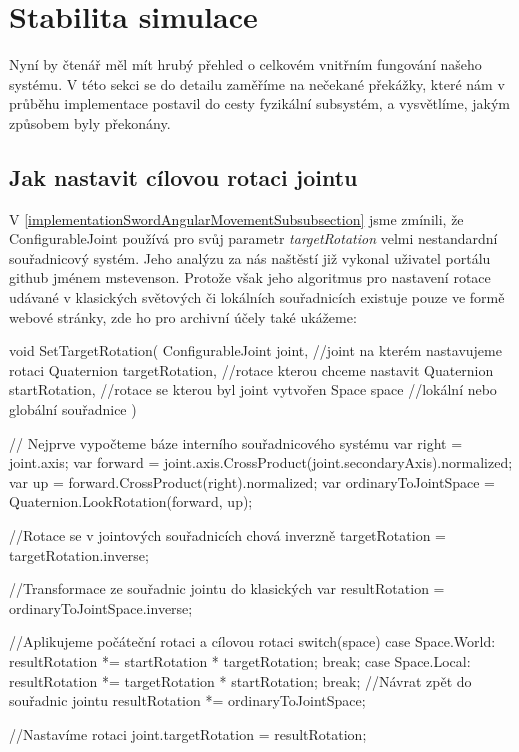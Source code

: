 \section{Stabilita simulace} \label{simulationStabilitySection}

Nyní by čtenář měl mít hrubý přehled o celkovém vnitřním fungování našeho systému. V této sekci se do detailu zaměříme na nečekané překážky, které nám v průběhu implementace postavil do cesty fyzikální subsystém, a vysvětlíme, jakým způsobem byly překonány.

\subsection{Jak nastavit cílovou rotaci jointu} \label{howToSetJointsTargetRotationSection}

V \ref{implementationSwordAngularMovementSubsubsection} jsme zmínili, že ConfigurableJoint používá pro svůj parametr \textit{targetRotation} velmi nestandardní souřadnicový systém. Jeho analýzu za nás naštěstí již vykonal \cite{ConfigurableJointExtensions} uživatel portálu github jménem mstevenson. Protože však jeho algoritmus pro nastavení rotace udávané v klasických světových či lokálních souřadnicích existuje pouze ve formě webové stránky, zde ho pro archivní účely také ukážeme: 

\begin{code}
void SetTargetRotation(
 ConfigurableJoint joint, //joint na kterém nastavujeme rotaci 
 Quaternion targetRotation, //rotace kterou chceme nastavit
 Quaternion startRotation, //rotace se kterou byl joint vytvořen
 Space space //lokální nebo globální souřadnice
)
{
 // Nejprve vypočteme báze interního souřadnicového systému
 var right = joint.axis;
 var forward = joint.axis.CrossProduct(joint.secondaryAxis).normalized;
 var up = forward.CrossProduct(right).normalized;
 var ordinaryToJointSpace = Quaternion.LookRotation(forward, up);
 
 //Rotace se v jointových souřadnicích chová inverzně
 targetRotation = targetRotation.inverse;

 //Transformace ze souřadnic jointu do klasických
 var resultRotation = ordinaryToJointSpace.inverse;

 //Aplikujeme počáteční rotaci a cílovou rotaci
 switch(space){
  case Space.World:
    resultRotation *= startRotation * targetRotation;
    break;
  case Space.Local:
    resultRotation *= targetRotation * startRotation;
    break;
 }
 //Návrat zpět do souřadnic jointu
 resultRotation *= ordinaryToJointSpace;
 
 //Nastavíme rotaci
 joint.targetRotation = resultRotation;
 }
\end{code}

